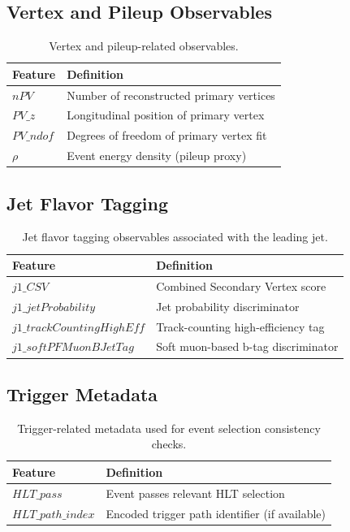 \documentclass[11pt,a4paper,twocolumn]{article}
\begin{document}
\subsection{Vertex and Pileup Observables}

\begin{table}[H]
\centering
\caption{Vertex and pileup-related observables.}
\footnotesize

\begin{tabular}{ll}
\toprule
Feature & Definition \\
\midrule
$nPV$ & Number of reconstructed primary vertices \\
$PV\_z$ & Longitudinal position of primary vertex \\
$PV\_ndof$ & Degrees of freedom of primary vertex fit \\
$\rho$ & Event energy density (pileup proxy) \\
\bottomrule
\end{tabular}

\end{table}

\subsection{Jet Flavor Tagging}

\begin{table}[H]
\centering
\caption{Jet flavor tagging observables associated with the leading jet.}
\footnotesize

\begin{tabular}{ll}
\toprule
Feature & Definition \\
\midrule
$j1\_CSV$ & Combined Secondary Vertex score \\
$j1\_jetProbability$ & Jet probability discriminator \\
$j1\_trackCountingHighEff$ & Track-counting high-efficiency tag \\
$j1\_softPFMuonBJetTag$ & Soft muon-based b-tag discriminator \\
\bottomrule
\end{tabular}

\end{table}

\subsection{Trigger Metadata}

\begin{table}[h]
\centering
\caption{Trigger-related metadata used for event selection consistency checks.}
\footnotesize

\begin{tabular}{ll}
\toprule
Feature & Definition \\
\midrule
$HLT\_pass$ & Event passes relevant HLT selection \\
$HLT\_path\_index$ & Encoded trigger path identifier (if available) \\
\bottomrule
\end{tabular}

\end{table}
\end{document}
